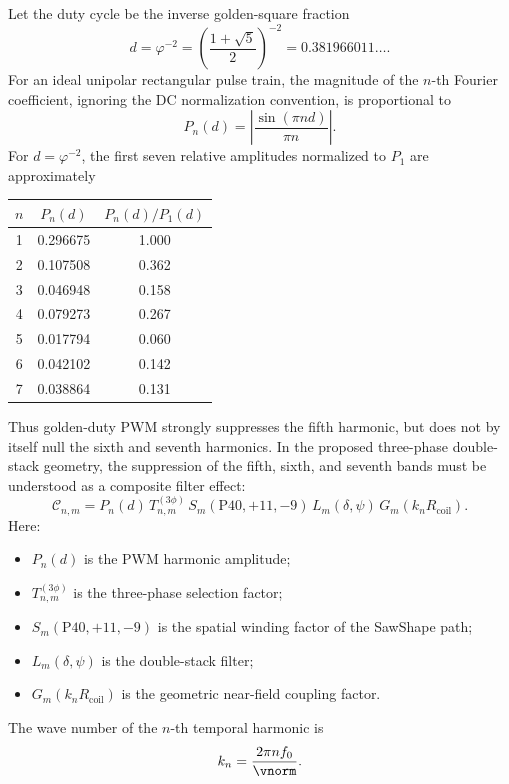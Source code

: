 Let the duty cycle be the inverse golden-square fraction
\begin{equation}
d = \varphi^{-2}
=
\left(\frac{1+\sqrt{5}}{2}\right)^{-2}
=
0.381966011\ldots .
\end{equation}
For an ideal unipolar rectangular pulse train, the magnitude of the $n$-th Fourier coefficient, ignoring the DC normalization convention, is proportional to
\begin{equation}
P_n(d)
=
\left|
\frac{\sin(\pi n d)}{\pi n}
\right|.
\label{eq:appendix_pwm_spectrum}
\end{equation}
For $d=\varphi^{-2}$, the first seven relative amplitudes normalized to $P_1$ are approximately
\begin{center}
\begin{tabular}{c|c|c}
\hline
$n$ & $P_n(d)$ & $P_n(d)/P_1(d)$ \\
\hline
1 & 0.296675 & 1.000 \\
2 & 0.107508 & 0.362 \\
3 & 0.046948 & 0.158 \\
4 & 0.079273 & 0.267 \\
5 & 0.017794 & 0.060 \\
6 & 0.042102 & 0.142 \\
7 & 0.038864 & 0.131 \\
\hline
\end{tabular}
\end{center}
Thus golden-duty PWM strongly suppresses the fifth harmonic, but does not by itself null the sixth and seventh harmonics. In the proposed three-phase double-stack geometry, the suppression of the fifth, sixth, and seventh bands must be understood as a composite filter effect:
\begin{equation}
\boxed{
\mathcal{C}_{n,m}
=
P_n(d)\,
T_{n,m}^{(3\phi)}\,
S_m(\mathrm{P40},+11,-9)\,
L_m(\delta,\psi)\,
G_m(k_nR_{\mathrm{coil}})
}.
\label{eq:appendix_composite_filter}
\end{equation}
Here:
\begin{itemize}
\item $P_n(d)$ is the PWM harmonic amplitude;
\item $T_{n,m}^{(3\phi)}$ is the three-phase selection factor;
\item $S_m(\mathrm{P40},+11,-9)$ is the spatial winding factor of the SawShape path;
\item $L_m(\delta,\psi)$ is the double-stack filter;
\item $G_m(k_nR_{\mathrm{coil}})$ is the geometric near-field coupling factor.
\end{itemize}
The wave number of the $n$-th temporal harmonic is
\begin{equation}
k_n
=
\frac{2\pi n f_0}{\vnorm}.
\end{equation}

